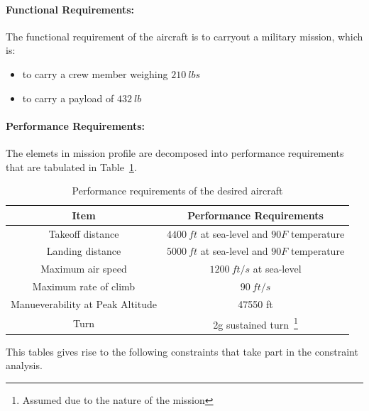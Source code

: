 \documentclass[pdftex,11pt,letter]{article}
\begin{document}
\paragraph{Functional Requirements:}
The functional requirement of the aircraft is to carryout a military mission, which is:
\begin{itemize}
\item to carry a crew member weighing  $210~lbs$ 
\item to carry a payload of $432~lb$
\end{itemize}
\paragraph{Performance Requirements:}
The elemets in mission profile are decomposed into performance requirements that are tabulated in Table~\ref{tab:performance_reqs}.
\begin{table}[h!]
\caption{Performance requirements of the desired aircraft}
\centering 
\begin{tabular}{c | c}
\hline\hline
Item  & Performance Requirements \\
\hline\hline
Takeoff distance 	& $4400~ft$ at sea-level and $90F$ temperature\\
Landing distance        & $5000~ft$  at sea-level and $90F$ temperature \\
Maximum air speed       & $1200~ft/s$ at sea-level \\
Maximum rate of climb   & $90~ft/s$\\
Manueverability at Peak Altitude                & 47550 ft\\
Turn                    & 2g sustained turn~\footnote{Assumed due to the nature of the mission}\\
\hline\hline
\end{tabular}
\label{tab:performance_reqs}
\end{table}
This tables gives rise to the following constraints that take part in the constraint analysis.
\end{document}
